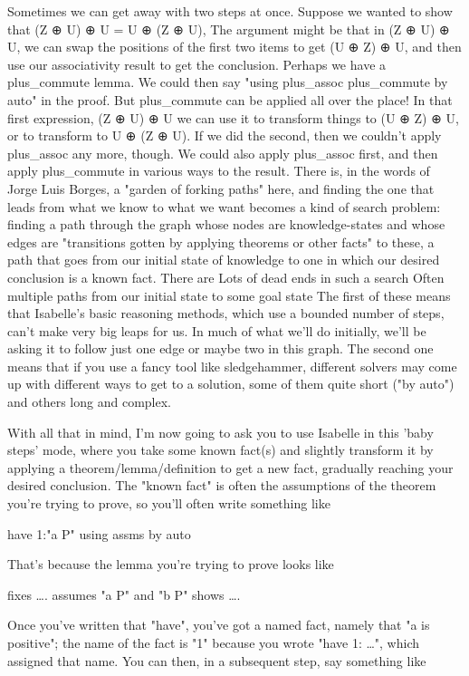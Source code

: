 Sometimes we can get away with two steps at once. Suppose we wanted to show that (Z ⊕ U) ⊕ U = U ⊕  (Z ⊕ U), The argument might be that in (Z ⊕ U) ⊕ U, we can swap the positions of the first two items to get (U ⊕ Z) ⊕ U, and then use our associativity result to get the conclusion. Perhaps we have a plus_commute lemma. We could then say "using plus_assoc plus_commute by auto" in the proof. But plus_commute can be applied all over the place! In that first expression, 
(Z ⊕ U) ⊕ U 
we can use it to transform things to (U ⊕ Z) ⊕ U, or to transform to U ⊕ (Z ⊕ U). If we did the second, then we couldn't apply plus_assoc any more, though. We could also apply plus_assoc first, and then apply plus_commute in various ways to the result. There is, in the words of Jorge Luis Borges, a "garden of forking paths" here, and finding the one that leads from what we know to what we want becomes a kind of search problem: finding a path through the graph whose nodes are knowledge-states and whose edges are "transitions gotten by applying theorems or other facts" to these, a path that goes from our initial state of knowledge to one in which our desired conclusion is a known fact. There are 
Lots of dead ends in such a search
Often multiple paths from our initial state to some goal state
The first of these means that Isabelle's basic reasoning methods, which use a bounded number of steps, can't make very big leaps for us. In much of what we'll do initially, we'll be asking it to follow just one edge or maybe two in this graph. The second one means that if you use a fancy tool like sledgehammer, different solvers may come up with different ways to get to a solution, some of them quite short ("by auto") and others long and complex. 

With all that in mind, I'm now going to ask you to use Isabelle in this 'baby steps' mode, where you take some known fact(s) and slightly transform it by applying a theorem/lemma/definition to get a new fact, gradually reaching your desired conclusion. The "known fact" is often the assumptions of the theorem you're trying to prove, so you'll often write something like 

   have   1:"a \in P" using assms by auto 

That's because the lemma you're trying to prove looks like

   fixes ….
   assumes "a \in P" and "b \in P"
   shows ….

Once you've written that "have", you've got a named fact, namely that "a is positive"; the name of the fact is "1" because you wrote "have 1: …", which assigned that name. You can then, in a subsequent step, say something like


